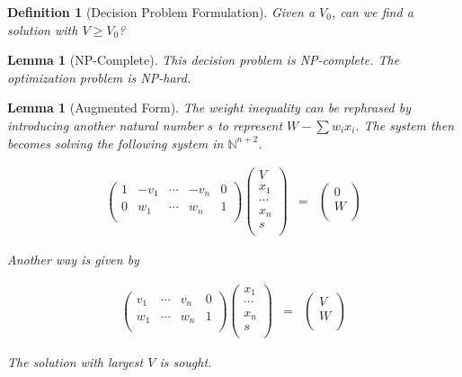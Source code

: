 \documentclass[11pt]{book}
\theoremstyle{change}
\newtheorem{definition}[equation]{Definition}
\newtheorem{lemma}[equation]{Lemma}
\theoremstyle{nonumberplain}
\numberwithin{equation}{section}
\begin{document}
\begin{definition}[Decision Problem Formulation]
Given a $V_0$, can we find a solution with $V \geq V_0$?
\end{definition}

\begin{lemma}[NP-Complete]
This decision problem is NP-complete. The optimization problem is NP-hard.
\end{lemma}

\begin{lemma}[Augmented Form]

The weight inequality can be rephrased by introducing another natural number $s$ to represent $W - \sum w_i x_i$. The system then becomes solving the following system in $\mathbb{N}^{n+2}$.

\begin{eqnarray*}
\begin{pmatrix}
1 & - v_1 & \cdots & -v_n & 0\\
0 & w_1 & \cdots & w_n & 1\\
\end{pmatrix}
\begin{pmatrix}
V\\
x_1\\
\cdots\\
x_n\\
s\\
\end{pmatrix}
&=&
\begin{pmatrix}
0\\
W\\
\end{pmatrix}
\end{eqnarray*}

Another way is given by

\begin{eqnarray*}
\begin{pmatrix}
v_1 & \cdots & v_n & 0\\
w_1 & \cdots & w_n & 1\\
\end{pmatrix}
\begin{pmatrix}
x_1\\
\cdots\\
x_n\\
s\\
\end{pmatrix}
&=&
\begin{pmatrix}
V\\
W\\
\end{pmatrix}
\end{eqnarray*}

The solution with largest $V$ is sought.

\end{lemma}
\end{document}
